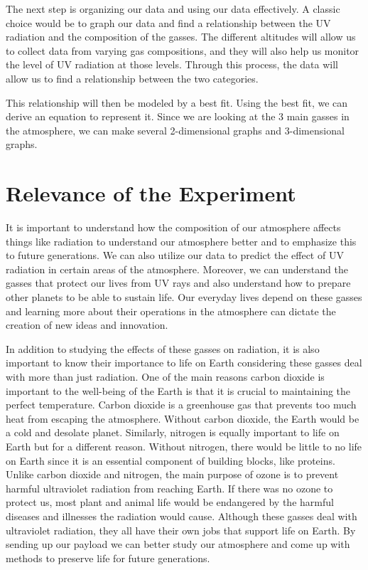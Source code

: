 \documentclass{article}
\begin{document}
The next step is organizing our data and using our data effectively. A classic choice would be to graph our data and find a relationship between the UV radiation and the composition of the gasses. The different altitudes will allow us to collect data from varying gas compositions, and they will also help us monitor the level of UV radiation at those levels. Through this process, the data will allow us to find a relationship between the two categories.

This relationship will then be modeled by a best fit. Using the best fit, we can derive an equation to represent it. Since we are looking at the 3 main gasses in the atmosphere, we can make several 2-dimensional graphs and 3-dimensional graphs.

\section{Relevance of the Experiment}

It is important to understand how the composition of our atmosphere affects things like radiation to understand our atmosphere better and to emphasize this to future generations. We can also utilize our data to predict the effect of UV radiation in certain areas of the atmosphere. Moreover, we can understand the gasses that protect our lives from UV rays and also understand how to prepare other planets to be able to sustain life. Our everyday lives depend on these gasses and learning more about their operations in the atmosphere can dictate the creation of new ideas and innovation.

In addition to studying the effects of these gasses on radiation, it is also important to know their importance to life on Earth considering these gasses deal with more than just radiation. One of the main reasons carbon dioxide is important to the well-being of the Earth is that it is crucial to maintaining the perfect temperature. Carbon dioxide is a greenhouse gas that prevents too much heat from escaping the atmosphere. Without carbon dioxide, the Earth would be a cold and desolate planet. Similarly, nitrogen is equally important to life on Earth but for a different reason. Without nitrogen, there would be little to no life on Earth since it is an essential component of building blocks, like proteins. Unlike carbon dioxide and nitrogen, the main purpose of ozone is to prevent harmful ultraviolet radiation from reaching Earth. If there was no ozone to protect us, most plant and animal life would be endangered by the harmful diseases and illnesses the radiation would cause. Although these gasses deal with ultraviolet radiation, they all have their own jobs that support life on Earth. By sending up our payload we can better study our atmosphere and come up with methods to preserve life for future generations.
\end{document}
